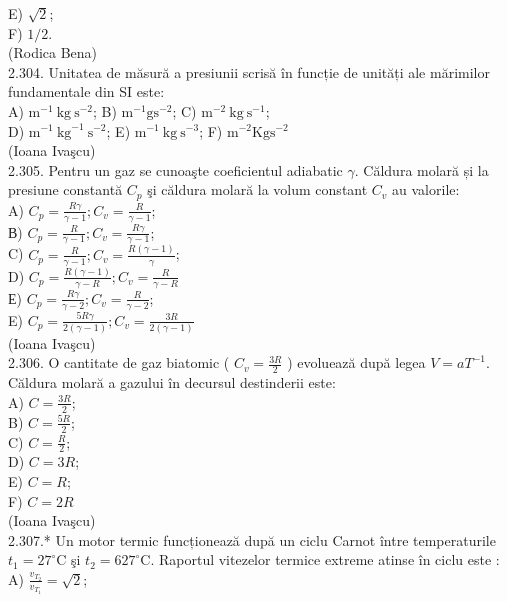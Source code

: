 \documentclass[10pt]{article}
\begin{document}
E) $\sqrt{2}$;\\
F) $1 / 2$.\\
(Rodica Bena)\\
2.304. Unitatea de măsură a presiunii scrisă în funcție de unități ale mărimilor fundamentale din SI este:\\
A) $\mathrm{m}^{-1} \mathrm{~kg} \mathrm{~s}^{-2}$; B) $\mathrm{m}^{-1} \mathrm{gs}^{-2}$; C) $\mathrm{m}^{-2} \mathrm{~kg} \mathrm{~s}^{-1}$;\\
D) $\mathrm{m}^{-1} \mathrm{~kg}^{-1} \mathrm{~s}^{-2}$; E) $\mathrm{m}^{-1} \mathrm{~kg} \mathrm{~s}^{-3}$; F) $\mathrm{m}^{-2} \mathrm{Kg} \mathrm{s}^{-2}$\\
(Ioana Ivaşcu)\\
2.305. Pentru un gaz se cunoaşte coeficientul adiabatic $\gamma$. Căldura molară și la presiune constantă $C_{p}$ şi căldura molară la volum constant $C_{v}$ au valorile:\\
A) $C_{p}=\frac{R \gamma}{\gamma-1} ; C_{v}=\frac{R}{\gamma-1}$;\\
В) $C_{p}=\frac{R}{\gamma-1} ; C_{v}=\frac{R \gamma}{\gamma-1}$;\\
C) $C_{p}=\frac{R}{\gamma-1} ; C_{v}=\frac{R(\gamma-1)}{\gamma}$;\\
D) $C_{p}=\frac{R(\gamma-1)}{\gamma-R} ; C_{v}=\frac{R}{\gamma-R}$\\
Е) $C_{p}=\frac{R \gamma}{\gamma-2} ; C_{v}=\frac{R}{\gamma-2}$;\\
E) $C_{p}=\frac{5 R \gamma}{2(\gamma-1)} ; C_{v}=\frac{3 R}{2(\gamma-1)}$\\
(Ioana Ivaşcu)\\
2.306. O cantitate de gaz biatomic ( $C_{v}=\frac{3 R}{2}$ ) evoluează după legea $V=a T^{-1}$. Căldura molară a gazului în decursul destinderii este:\\
A) $C=\frac{3 R}{2}$;\\
B) $C=\frac{5 R}{2}$;\\
C) $C=\frac{R}{2}$;\\
D) $C=3 R$;\\
E) $C=R$;\\
F) $C=2 R$\\
(Ioana Ivaşcu)\\
2.307.* Un motor termic funcționează după un ciclu Carnot între temperaturile $t_{1}=27^{\circ} \mathrm{C}$ şi $t_{2}=627^{\circ} \mathrm{C}$. Raportul vitezelor termice extreme atinse în ciclu este :\\
A) $\frac{v_{T_{2}}}{v_{T_{1}}}=\sqrt{2}$;\\
\end{document}

